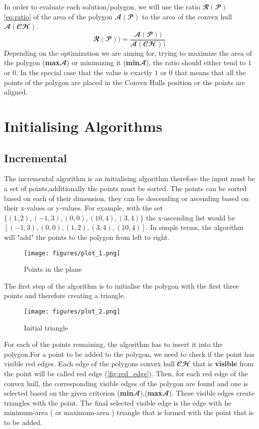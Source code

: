 \documentclass[12pt]{article}
\begin{document}
    In order to evaluate each solution/polygon, we will use the ratio $\mathbfcal{R(P)}$ \ref{eq:ratio} of the area of the polygon $\mathbfcal{A(P)}$ to the area of the convex hull $\mathbfcal{A(CH)}$.
    \begin{equation} 
    \label{eq:ratio}
    \mathbfcal{R(P))} = \frac{\mathbfcal{A(P))}}{\mathbfcal{A(CH))}}    
    \end{equation}
    Depending on the optimization we are aiming for, trying to maximize the area of the polygon (\textbf{max}$\mathbfcal{A}$) or minimizing it (\textbf{min}$\mathbfcal{A}$), the ratio should either tend to $1$ or $0$. In the special case that the value is exactly $1$ or $0$ that means that all the points of the polygon are placed in the Convex Hulls position or the points are aligned.
 
	\section{Initialising Algorithms}
	\label{sec:initilising_algorithms}
    \subsection{Incremental}

    The incremental algorithm is an initialising algorithm therefore the input must be a set of points,additionally the points must be sorted. The points can be sorted based on each of their dimension, they can be descending or ascending based on their x-values or y-values. For example, with the set $\{ (1,2) , (-1,3) , (0,0) , (10,4) , (3,4) \} $ the x-ascending list would be $ [(-1,3) ,  (0,0) , (1,2) ,  (3,4), (10,4) ]$. In simple terms, the algorithm will "add" the points to the polygon from left to right.
\begin{figure}[!htb]
 \centering
 \texttt{[image: figures/plot\_1.png]}
 \caption{Points in the plane}
 \label{fig:poinys_plane}
\end{figure}
    
    The first step of the algorithm is to initialise the polygon with the first three points and therefore creating a triangle.

\begin{figure}[!htb]
 \centering
 \texttt{[image: figures/plot\_2.png]}
 \caption{Initial triangle}
 \label{fig:init_triangle}
\end{figure}

    For each of the points remaining, the algorithm has to insert it into the polygon.For a point to be added to the polygon, we need to check if the point has visible red edges. Each edge of the polygons convex hull $\mathbfcal{CH}$  that is \textbf{visible} from the point will be called red edge (\ref{fig:red_edge}).
    Then, for each red edge of the convex hull, the corresponding visible edges of the polygon are found and one is selected based on the given criterion (\textbf{min}$\mathbfcal{A}$),(\textbf{max}$\mathbfcal{A}$). These visible edges create triangles with the point. The final selected visible edge is the edge with he minimum-area ( or maximum-area ) triangle that is formed with the point that is to be added.
    
\end{document}
